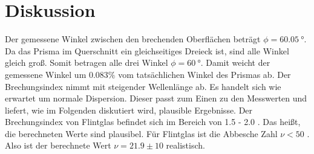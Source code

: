 \section{Diskussion}
\label{sec:Diskussion}

Der gemessene Winkel zwischen den brechenden Oberflächen beträgt $\phi=\SI{60.05}{\degree}$. Da das Prisma im Querschnitt ein gleichseitiges Dreieck ist, sind alle Winkel gleich groß. Somit betragen alle drei Winkel $\phi=\SI{60}{\degree}$. Damit weicht der gemessene Winkel um $0.083\%$ vom tatsächlichen Winkel des Prismas ab.
Der Brechungsindex nimmt mit steigender Wellenlänge ab. Es handelt sich wie erwartet um normale Dispersion. Dieser passt zum Einen zu den Messwerten und liefert, wie im Folgenden diskutiert wird, plausible Ergebnisse.   Der Brechungsindex von Flintglas befindet sich im Bereich von 1.5 - 2.0 \cite{chemie.de}. Das heißt, die berechneten Werte sind plausibel.
Für  Flintglas ist die Abbesche Zahl $\nu<50$ \cite{chemie.de}. Also ist der berechnete Wert  $\nu = 21.9 \pm 10$ realistisch.

